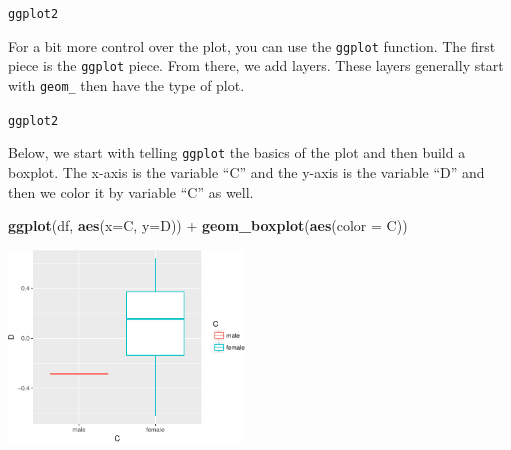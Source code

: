 \documentclass[10pt,ignorenonframetext,]{beamer}
\newenvironment{Shaded}{\begin{snugshade}}{\end{snugshade}}
\newcommand{\KeywordTok}[1]{\textcolor[rgb]{0.13,0.29,0.53}{\textbf{{#1}}}}
\newcommand{\DataTypeTok}[1]{\textcolor[rgb]{0.13,0.29,0.53}{{#1}}}
\newcommand{\StringTok}[1]{\textcolor[rgb]{0.31,0.60,0.02}{{#1}}}
\newcommand{\NormalTok}[1]{{#1}}
\begin{document}
\begin{frame}[fragile]{\texttt{ggplot2}}

For a bit more control over the plot, you can use the \texttt{ggplot}
function. The first piece is the \texttt{ggplot} piece. From there, we
add layers. These layers generally start with \texttt{geom\_} then have
the type of plot.

\end{frame}

\begin{frame}[fragile]{\texttt{ggplot2}}

Below, we start with telling \texttt{ggplot} the basics of the plot and
then build a boxplot. The x-axis is the variable ``C'' and the y-axis is
the variable ``D'' and then we color it by variable ``C'' as well.

\begin{Shaded}
\begin{Highlighting}[]
\KeywordTok{ggplot}\NormalTok{(df, }\KeywordTok{aes}\NormalTok{(}\DataTypeTok{x=}\NormalTok{C, }\DataTypeTok{y=}\NormalTok{D)) +}
\StringTok{  }\KeywordTok{geom_boxplot}\NormalTok{(}\KeywordTok{aes}\NormalTok{(}\DataTypeTok{color =} \NormalTok{C))}
\end{Highlighting}
\end{Shaded}

\centerline{\includegraphics[height=2in]{03_UnderstandData_files/figure-beamer/unnamed-chunk-11-1.pdf}}

\end{frame}
\end{document}
